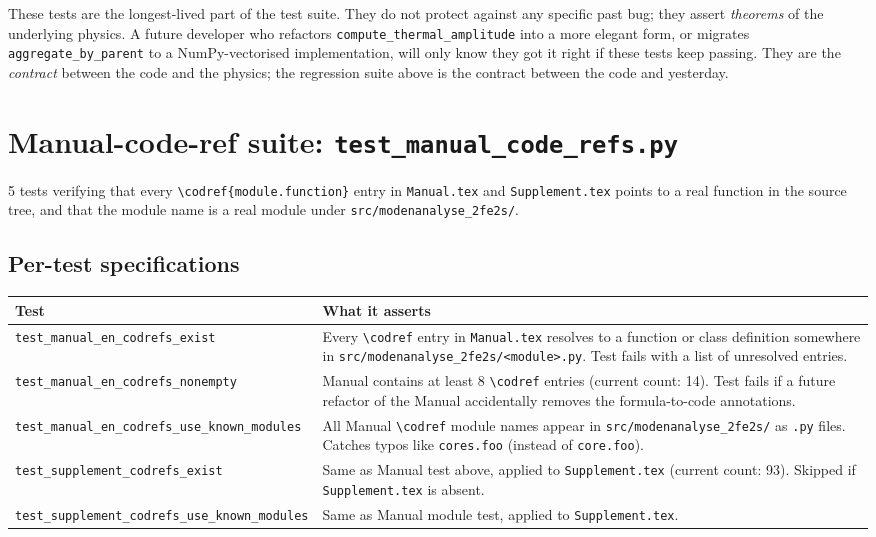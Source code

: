 \documentclass[10pt,a4paper,twoside]{article}
\newcommand{\fn}[1]{\texttt{#1}}
\newcommand{\file}[1]{\texttt{#1}}
\begin{document}
These tests are the longest-lived part of the test suite. They do
not protect against any specific past bug; they assert
\emph{theorems} of the underlying physics. A future developer who
refactors \fn{compute\_thermal\_amplitude} into a more elegant
form, or migrates \fn{aggregate\_by\_parent} to a NumPy-vectorised
implementation, will only know they got it right if these tests
keep passing. They are the \emph{contract} between the code and
the physics; the regression suite above is the contract between
the code and yesterday.

\section{Manual-code-ref suite: \fn{test\_manual\_code\_refs.py}}

5 tests verifying that every \texttt{\textbackslash codref\{module.function\}}
entry in \fn{Manual.tex} and \fn{Supplement.tex} points to a real
function in the source tree, and that the module name is a real
module under \file{src/modenanalyse\_2fe2s/}.

\subsection{Per-test specifications}

\begin{longtable}{p{} p{}}
\toprule
\textbf{Test} & \textbf{What it asserts} \\
\midrule
\texttt{test\_manual\_en\_codrefs\_exist}
 & Every \texttt{\textbackslash codref} entry in
   \file{Manual.tex} resolves to a function or class definition
   somewhere in \file{src/modenanalyse\_2fe2s/<module>.py}. Test
   fails with a list of unresolved entries. \\
\midrule
\texttt{test\_manual\_en\_codrefs\_nonempty}
 & Manual contains at least 8
   \texttt{\textbackslash codref} entries
   (current count: 14). Test fails if a future refactor of the
   Manual accidentally removes the formula-to-code annotations. \\
\midrule
\texttt{test\_manual\_en\_codrefs\_use\_known\_modules}
 & All Manual \texttt{\textbackslash codref} module names appear in
   \file{src/modenanalyse\_2fe2s/} as \texttt{.py} files. Catches
   typos like \texttt{cores.foo} (instead of \texttt{core.foo}). \\
\midrule
\texttt{test\_supplement\_codrefs\_exist}
 & Same as Manual test above, applied to \file{Supplement.tex}
   (current count: 93). Skipped if \file{Supplement.tex} is
   absent. \\
\midrule
\texttt{test\_supplement\_codrefs\_use\_known\_modules}
 & Same as Manual module test, applied to
   \file{Supplement.tex}. \\
\bottomrule
\end{longtable}
\end{document}
